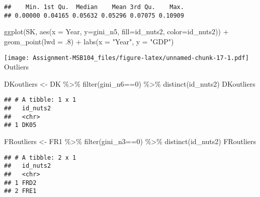 \documentclass[
]{article}
\newenvironment{Shaded}{\begin{snugshade}}{\end{snugshade}}
\newcommand{\AttributeTok}[1]{\textcolor[rgb]{0.77,0.63,0.00}{#1}}
\newcommand{\DecValTok}[1]{\textcolor[rgb]{0.00,0.00,0.81}{#1}}
\newcommand{\FunctionTok}[1]{\textcolor[rgb]{0.00,0.00,0.00}{#1}}
\newcommand{\NormalTok}[1]{#1}
\newcommand{\OtherTok}[1]{\textcolor[rgb]{0.56,0.35,0.01}{#1}}
\newcommand{\SpecialCharTok}[1]{\textcolor[rgb]{0.00,0.00,0.00}{#1}}
\newcommand{\StringTok}[1]{\textcolor[rgb]{0.31,0.60,0.02}{#1}}
\begin{document}
\begin{verbatim}
##    Min. 1st Qu.  Median    Mean 3rd Qu.    Max. 
## 0.00000 0.04165 0.05632 0.05296 0.07075 0.10909
\end{verbatim}

\begin{Shaded}
\begin{Highlighting}[]
  \FunctionTok{ggplot}\NormalTok{(SK, }\FunctionTok{aes}\NormalTok{(}\AttributeTok{x =}\NormalTok{ Year, }\AttributeTok{y=}\NormalTok{gini\_n5, }\AttributeTok{fill=}\NormalTok{id\_nuts2, }\AttributeTok{color=}\NormalTok{id\_nuts2)) }\SpecialCharTok{+}
  \FunctionTok{geom\_point}\NormalTok{(}\AttributeTok{lwd =}\NormalTok{ .}\DecValTok{8}\NormalTok{) }\SpecialCharTok{+}
   \FunctionTok{labs}\NormalTok{(}\AttributeTok{x =} \StringTok{"Year"}\NormalTok{, }\AttributeTok{y =} \StringTok{"GDP"}\NormalTok{)}
\end{Highlighting}
\end{Shaded}

\texttt{[image: Assignment-MSB104\_files/figure-latex/unnamed-chunk-17-1.pdf]}
Outliers

\begin{Shaded}
\begin{Highlighting}[]
\NormalTok{DKoutliers }\OtherTok{\textless{}{-}}\NormalTok{ DK }\SpecialCharTok{\%\textgreater{}\%}
  \FunctionTok{filter}\NormalTok{(gini\_n6}\SpecialCharTok{==}\DecValTok{0}\NormalTok{) }\SpecialCharTok{\%\textgreater{}\%}
  \FunctionTok{distinct}\NormalTok{(id\_nuts2)}
\NormalTok{DKoutliers}
\end{Highlighting}
\end{Shaded}

\begin{verbatim}
## # A tibble: 1 x 1
##   id_nuts2
##   <chr>   
## 1 DK05
\end{verbatim}

\begin{Shaded}
\begin{Highlighting}[]
\NormalTok{FRoutliers }\OtherTok{\textless{}{-}}\NormalTok{ FR1 }\SpecialCharTok{\%\textgreater{}\%}
  \FunctionTok{filter}\NormalTok{(gini\_n3}\SpecialCharTok{==}\DecValTok{0}\NormalTok{) }\SpecialCharTok{\%\textgreater{}\%}
  \FunctionTok{distinct}\NormalTok{(id\_nuts2)}
\NormalTok{FRoutliers}
\end{Highlighting}
\end{Shaded}

\begin{verbatim}
## # A tibble: 2 x 1
##   id_nuts2
##   <chr>   
## 1 FRD2    
## 2 FRE1
\end{verbatim}
\end{document}
